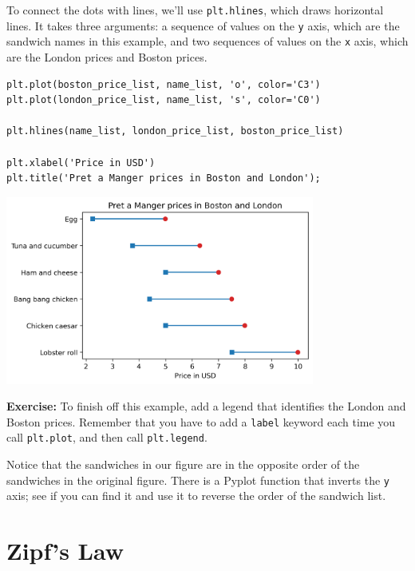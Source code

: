 To connect the dots with lines, we'll use
\passthrough{\lstinline!plt.hlines!}, which draws horizontal lines. It
takes three arguments: a sequence of values on the
\passthrough{\lstinline!y!} axis, which are the sandwich names in this
example, and two sequences of values on the \passthrough{\lstinline!x!}
axis, which are the London prices and Boston prices.

\begin{lstlisting}[]
plt.plot(boston_price_list, name_list, 'o', color='C3')
plt.plot(london_price_list, name_list, 's', color='C0')

plt.hlines(name_list, london_price_list, boston_price_list)

plt.xlabel('Price in USD')
plt.title('Pret a Manger prices in Boston and London');
\end{lstlisting}

\begin{center}
\includegraphics[width=4in]{chapters/06_plotting_files/06_plotting_47_0.png}
\end{center}

\textbf{Exercise:} To finish off this example, add a legend that
identifies the London and Boston prices. Remember that you have to add a
\passthrough{\lstinline!label!} keyword each time you call
\passthrough{\lstinline!plt.plot!}, and then call
\passthrough{\lstinline!plt.legend!}.

Notice that the sandwiches in our figure are in the opposite order of
the sandwiches in the original figure. There is a Pyplot function that
inverts the \passthrough{\lstinline!y!} axis; see if you can find it and
use it to reverse the order of the sandwich list.

\hypertarget{zipfs-law}{%
\section{Zipf's Law}\label{zipfs-law}}

